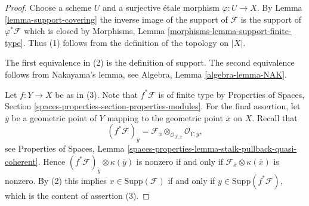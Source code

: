 \documentclass[10pt,a4paper]{amsart}
\theoremstyle{plain}
\theoremstyle{definition}
\theoremstyle{remark}
\numberwithin{equation}{subsection}
\begin{document}
\begin{proof}
Choose a scheme $U$ and a surjective \'etale morphism $\varphi : U \to X$.
By Lemma \ref{lemma-support-covering} the inverse image of the support of
$\mathcal{F}$ is the support of $\varphi^*\mathcal{F}$ which is closed by
Morphisms, Lemma \ref{morphisms-lemma-support-finite-type}.
Thus (1) follows from the definition of the topology on $|X|$.

\medskip\noindent
The first equivalence in (2) is the definition of support.
The second equivalence follows from Nakayama's lemma, see
Algebra, Lemma \ref{algebra-lemma-NAK}.

\medskip\noindent
Let $f : Y \to X$ be as in (3). Note that $f^*\mathcal{F}$ is of finite type
by Properties of Spaces, Section
\ref{spaces-properties-section-properties-modules}.
For the final assertion, let $\overline{y}$ be a geometric point of $Y$
mapping to the geometric point $\overline{x}$ on $X$. Recall that
$$
(f^*\mathcal{F})_{\overline{y}} =
\mathcal{F}_{\overline{x}} \otimes_{\mathcal{O}_{X, \overline{x}}}
\mathcal{O}_{Y, \overline{y}},
$$
see Properties of Spaces, Lemma
\ref{spaces-properties-lemma-stalk-pullback-quasi-coherent}.
Hence $(f^*\mathcal{F})_{\overline{y}} \otimes \kappa(\overline{y})$
is nonzero if and only if
$\mathcal{F}_{\overline{x}} \otimes \kappa(\overline{x})$ is nonzero.
By (2) this implies $x \in \text{Supp}(\mathcal{F})$ if and only
if $y \in \text{Supp}(f^*\mathcal{F})$, which is the content of
assertion (3).
\end{proof}
\end{document}
